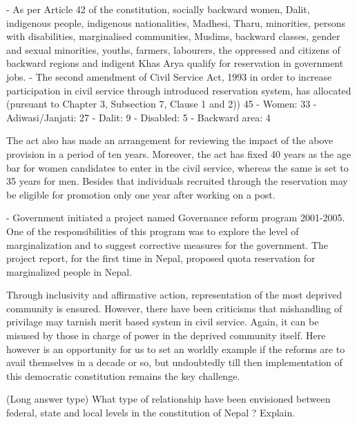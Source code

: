 \documentclass[
  openany]{book}
\newcommand{\question}{\item}
\begin{document}
\begin{questions}
- As per Article 42 of the constitution, socially backward women, Dalit, indigenous people, indigenous nationalities, Madhesi, Tharu, minorities, persons with disabilities, marginalised communities, Muslims, backward classes, gender and sexual minorities, youths, farmers, labourers, the oppressed and citizens of backward regions and indigent Khas Arya qualify for reservation in government jobs.
- The second amendment of Civil Service Act, 1993 in order to increase participation in civil service through introduced reservation system, has allocated (pursuant to Chapter 3, Subsection 7, Clause 1 and 2)) 45%
  - Women: 33%
  - Adiwasi/Janjati: 27%
  - Dalit: 9%
  - Disabled: 5%
  - Backward area: 4%
  
The act also has made an arrangement for reviewing the impact of the above provision in a period of ten years. Moreover, the act has fixed 40 years as the age bar for women candidates to enter in the civil service, whereas the same is set to 35 years for men. Besides that individuals recruited through the reservation may be eligible for promotion only one year after working on a post.

- Government initiated a project named Governance reform program 2001-2005. One of the responsibilities of this program was to explore the level of marginalization and to suggest corrective measures for the government. The project report, for the first time in Nepal, proposed quota reservation for marginalized people in Nepal.

Through inclusivity and affirmative action, representation of the most deprived community is ensured. However, there have been criticisms that mishandling of privilage may tarnish merit based system in civil service. Again, it can be misused by those in charge of power in the deprived community itself. Here however is an opportunity for us to set an worldly example if the reforms are to avail themselves in a decade or so, but undoubtedly till then implementation of this democratic constitution remains the key challenge.

\question (Long answer type) What type of relationship have been envisioned between federal, state and local levels in the constitution of Nepal ? Explain.


\end{questions}
\end{document}

